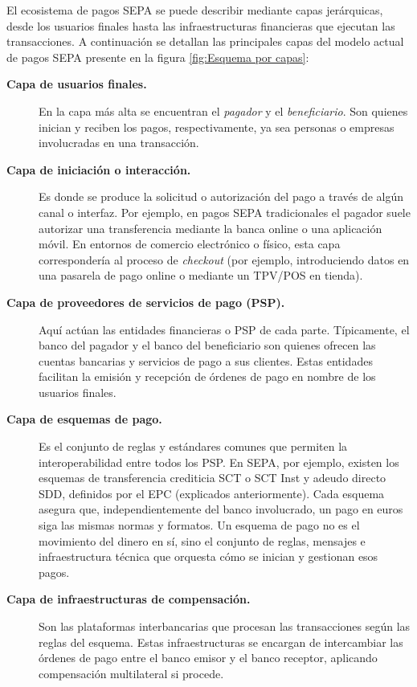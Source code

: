 El ecosistema de pagos SEPA se puede describir mediante capas jerárquicas, desde los usuarios finales hasta las infraestructuras financieras que ejecutan las transacciones. A continuación se detallan las principales capas del modelo actual de pagos SEPA presente en la figura \ref{fig:Esquema por capas}:

\begin{description}
  \item[\textbf{Capa de usuarios finales.}] 
    En la capa más alta se encuentran el \emph{pagador} y el \emph{beneficiario}. Son quienes inician y reciben los pagos, respectivamente, ya sea personas o empresas involucradas en una transacción.

  \item[\textbf{Capa de iniciación o interacción.}] 
    Es donde se produce la solicitud o autorización del pago a través de algún canal o interfaz. Por ejemplo, en pagos SEPA tradicionales el pagador suele autorizar una transferencia mediante la banca online o una aplicación móvil. En entornos de comercio electrónico o físico, esta capa correspondería al proceso de \emph{checkout} (por ejemplo, introduciendo datos en una pasarela de pago online o mediante un TPV/POS en tienda).

  \item[\textbf{Capa de proveedores de servicios de pago (PSP).}] 
    Aquí actúan las entidades financieras o PSP de cada parte. Típicamente, el banco del pagador y el banco del beneficiario son quienes ofrecen las cuentas bancarias y servicios de pago a sus clientes. Estas entidades facilitan la emisión y recepción de órdenes de pago en nombre de los usuarios finales.

  \item[\textbf{Capa de esquemas de pago.}] 
    Es el conjunto de reglas y estándares comunes que permiten la interoperabilidad entre todos los PSP. En SEPA, por ejemplo, existen los esquemas de transferencia crediticia SCT o SCT Inst y adeudo directo SDD, definidos por el EPC (explicados anteriormente). Cada esquema asegura que, independientemente del banco involucrado, un pago en euros siga las mismas normas y formatos. Un esquema de pago no es el movimiento del dinero en sí, sino el conjunto de reglas, mensajes e infraestructura técnica que orquesta cómo se inician y gestionan esos pagos.

  \item[\textbf{Capa de infraestructuras de compensación.}] 
    Son las plataformas interbancarias que procesan las transacciones según las reglas del esquema. Estas infraestructuras se encargan de intercambiar las órdenes de pago entre el banco emisor y el banco receptor, aplicando compensación multilateral si procede.


\end{description}
